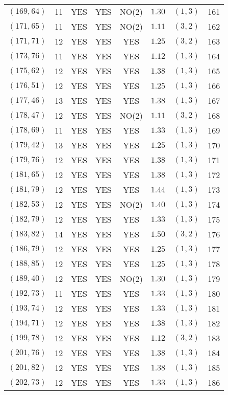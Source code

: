 \begin{longtable}{|c|c|c|c|c|c|c|c|}
$(169,64)$ & 11 & YES & YES & NO(2) & $1.30$ & $(1,3)$ & 161\\
$(171,65)$ & 11 & YES & YES & NO(2) & $1.11$ & $(3,2)$ & 162\\
$(171,71)$ & 12 & YES & YES & YES & $1.25$ & $(3,2)$ & 163\\
$(173,76)$ & 11 & YES & YES & YES & $1.12$ & $(1,3)$ & 164\\
$(175,62)$ & 12 & YES & YES & YES & $1.38$ & $(1,3)$ & 165\\
$(176,51)$ & 12 & YES & YES & YES & $1.25$ & $(1,3)$ & 166\\
$(177,46)$ & 13 & YES & YES & YES & $1.38$ & $(1,3)$ & 167\\
$(178,47)$ & 12 & YES & YES & NO(2) & $1.11$ & $(3,2)$ & 168\\
$(178,69)$ & 11 & YES & YES & YES & $1.33$ & $(1,3)$ & 169\\
$(179,42)$ & 13 & YES & YES & YES & $1.25$ & $(1,3)$ & 170\\
$(179,76)$ & 12 & YES & YES & YES & $1.38$ & $(1,3)$ & 171\\
$(181,65)$ & 12 & YES & YES & YES & $1.38$ & $(1,3)$ & 172\\
$(181,79)$ & 12 & YES & YES & YES & $1.44$ & $(1,3)$ & 173\\
$(182,53)$ & 12 & YES & YES & NO(2) & $1.40$ & $(1,3)$ & 174\\
$(182,79)$ & 12 & YES & YES & YES & $1.33$ & $(1,3)$ & 175\\
$(183,82)$ & 14 & YES & YES & YES & $1.50$ & $(3,2)$ & 176\\
$(186,79)$ & 12 & YES & YES & YES & $1.25$ & $(1,3)$ & 177\\
$(188,85)$ & 12 & YES & YES & YES & $1.25$ & $(1,3)$ & 178\\
$(189,40)$ & 12 & YES & YES & NO(2) & $1.30$ & $(1,3)$ & 179\\
$(192,73)$ & 11 & YES & YES & YES & $1.33$ & $(1,3)$ & 180\\
$(193,74)$ & 12 & YES & YES & YES & $1.33$ & $(1,3)$ & 181\\
$(194,71)$ & 12 & YES & YES & YES & $1.38$ & $(1,3)$ & 182\\
$(199,78)$ & 12 & YES & YES & YES & $1.12$ & $(3,2)$ & 183\\
$(201,76)$ & 12 & YES & YES & YES & $1.38$ & $(1,3)$ & 184\\
$(201,82)$ & 12 & YES & YES & YES & $1.38$ & $(1,3)$ & 185\\
$(202,73)$ & 12 & YES & YES & YES & $1.33$ & $(1,3)$ & 186\\

\end{longtable}
